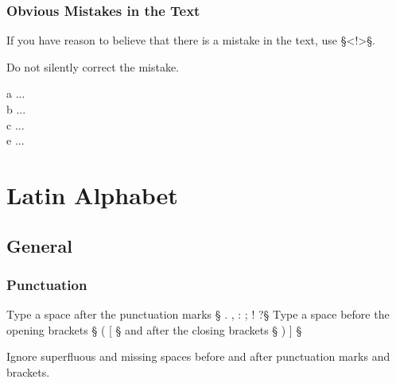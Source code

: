 \subsubsection{Obvious Mistakes in the Text}
\label{section obvious mistakes}

\begin{mainrule}
If you have reason to believe that there is a mistake in the text, use §<!>§. 
\end{mainrule}

\begin{clarification}
Do not silently correct the mistake.
\end{clarification}

\vspace{3mm}
\begin{example}

\vspace{-5mm}
\begin{typeLatin}
 a\bold{>} ...  \\
 b\bold{>} ...  \\
 c\bold{>} ...  \\
 e\bold{><!>} ...  \\
\end{typeLatin}
\end{example}


\section{Latin Alphabet}

\tocspace
\subsection{General}
\label{section latin general}

\subsubsection{Punctuation}
\label{section latin punctuation}

\begin{mainrule}
Type a space after the punctuation marks § . , : ; ! ?§ \quad 
Type a space before the opening brackets § ( [ § and after the closing brackets  § ) ] §
\end{mainrule}

\begin{clarification}
Ignore superfluous and missing spaces before and after punctuation marks and brackets.
\end{clarification}

